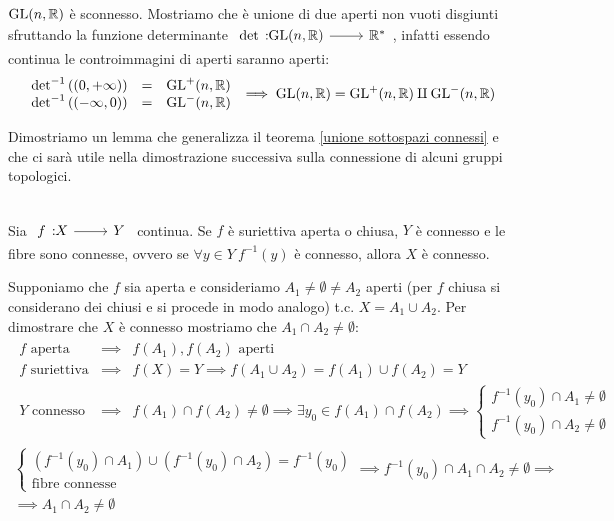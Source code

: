 \begin{observe}
	$\operatorname{GL}(n,\mathbb{R})$ è sconnesso. Mostriamo che è unione di due aperti non vuoti disgiunti sfruttando la funzione determinante $\funz \det {\gl(n,\realset)} {\realset^*}$, infatti essendo continua  le controimmagini di aperti saranno aperti:
		\begin{gather*}
			\begin{array}{lcl}
				\det^{-1} \left( (0,+\infty)\right) & = & \operatorname{GL} ^+ (n,\mathbb{R}) \\
				\det^{-1} \left( (-\infty,0)\right) & = & \operatorname{GL} ^- (n,\mathbb{R}) \\
			\end{array}
		\implies \operatorname{GL}(n,\mathbb{R})=\operatorname{GL}^+(n,\mathbb{R}) \amalg \operatorname{GL}^-(n,\mathbb{R})
		\end{gather*}
	\vspace{-3mm}
\end{observe}
 Dimostriamo un lemma che generalizza il teorema \ref{unione sottospazi connessi} e che ci sarà utile nella dimostrazione successiva sulla connessione di alcuni gruppi topologici.
\begin{lemming}~{}\\
	Sia $\funz f X Y$ continua. Se $f$ è suriettiva aperta o chiusa, $Y$ è connesso e le fibre sono connesse, ovvero se $\forall y\in Y \ f^{-1}(y)$ è connesso, allora $X$ è connesso.
\end{lemming}
\begin{demonstration}
	Supponiamo che $f$ sia aperta e consideriamo $A_1\neq\emptyset\neq A_2$ aperti (per $f$ chiusa si considerano dei chiusi e si procede in modo analogo) t.c. $X=A_1\cup A_2$. Per dimostrare che $X$ è connesso mostriamo che $A_1\cap A_2\neq\emptyset$:
		\begin{gather*}
			\begin{array}{lcl}
				f \text{ aperta } & \implies & f(A_1), f(A_2) \text{ aperti}\\
				f \text{ suriettiva} & \implies & f(X)=Y \implies f(A_1\cup A_2)=f(A_1)\cup f(A_2)=Y \\
				Y \text{ connesso } & \implies & f(A_1)\cap f(A_2)\neq\emptyset \implies \exists y_0\in f(A_1)\cap f(A_2) \implies \begin{cases}
					f^{-1}(y_0) \cap A_1\neq \emptyset \\
					f^{-1}(y_0) \cap A_2\neq \emptyset
				\end{cases}
			\end{array} \\
				\begin{cases}
					\left( f^{-1}(y_0)\cap A_1 \right)\cup \left( f^{-1}(y_0)\cap A_2 \right)=f^{-1}(y_0) \\
					\text{fibre connesse }
				\end{cases}
				 \implies  f^{-1}(y_0)\cap A_1\cap A_2\neq\emptyset\implies\\
				 \implies A_1\cap A_2\neq\emptyset
		\end{gather*}
\end{demonstration}
